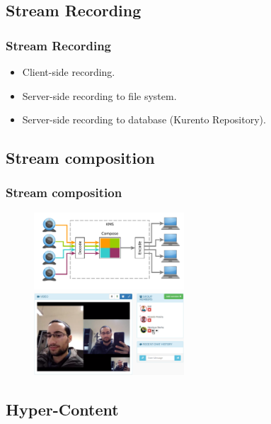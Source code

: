 \documentclass[compress]{beamer}
\begin{document}
\subsection{Stream Recording}
\begin{frame}[c]
\centering
		\frametitle{Stream Recording}

		\begin{itemize}
\item Client-side recording.
		\vfill

\item Server-side recording to file system.
		\vfill

\item Server-side recording to database (Kurento Repository).
		\end{itemize}
	\end{frame}


\subsection{Stream composition}

		\begin{frame}[c]
		\frametitle{Stream composition}
		\begin{figure}
			\includegraphics[width=0.5\textwidth]{figures/wcomposite.pdf}
			\includegraphics[width=0.5\textwidth]{figures/devices.png}
		\end{figure}
		\end{frame}


\subsection{Hyper-Content}
\end{document}
